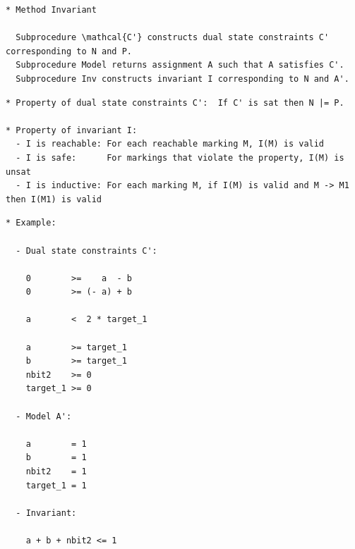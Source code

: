 \documentclass{llncs}
\begin{document}
\begin{verbatim}
* Method Invariant

  Subprocedure \mathcal{C'} constructs dual state constraints C' corresponding to N and P.
  Subprocedure Model returns assignment A such that A satisfies C'.
  Subprocedure Inv constructs invariant I corresponding to N and A'.
\end{verbatim}

\begin{center}
\end{center}

\begin{verbatim}
* Property of dual state constraints C':  If C' is sat then N |= P.

* Property of invariant I:
  - I is reachable: For each reachable marking M, I(M) is valid
  - I is safe:      For markings that violate the property, I(M) is unsat
  - I is inductive: For each marking M, if I(M) is valid and M -> M1 then I(M1) is valid
\end{verbatim}

\newpage
\begin{verbatim}
* Example:

  - Dual state constraints C':

    0        >=    a  - b
    0        >= (- a) + b

    a        <  2 * target_1

    a        >= target_1
    b        >= target_1
    nbit2    >= 0
    target_1 >= 0

  - Model A':

    a        = 1
    b        = 1
    nbit2    = 1
    target_1 = 1
    
  - Invariant:

    a + b + nbit2 <= 1

\end{verbatim}
\end{document}
